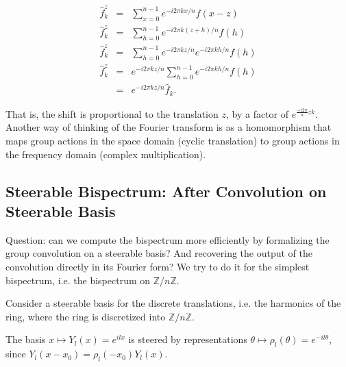\documentclass{article}
\begin{document}
\vspace{-0.7cm}
\begin{eqnarray*}
  \hat{f}^z_k &=& \sum_{x=0}^{n-1}e^{-i2\pi k x / n} f(x - z) \\
  \hat{f}^z_k &=& \sum_{h=0}^{n-1}e^{-i2\pi k (z+h) / n} f(h) \\
  \hat{f}^z_k &=& \sum_{h=0}^{n-1} e^{-i2\pi k z / n} e^{-i2\pi k h / n} f(h) \\
  \hat{f}^z_k  &=&  e^{-i2\pi k z / n} \sum_{h=0}^{n-1} e^{-i2\pi k h / n} f(h) \\
  &=& e^{-i2\pi k z / n} \hat{f}_k.
\end{eqnarray*}
\vspace{-0.7cm}

That is, the shift is proportional to the translation $z$, by a factor of $e^{\frac{-i 2 \pi}{n} z k}$. Another way of thinking of the Fourier transform is as a homomorphism that maps group actions in the space domain (cyclic translation) to group actions in the frequency domain (complex multiplication).

\subsection{Steerable Bispectrum: After Convolution on Steerable Basis}

Question: can we compute the bispectrum more efficiently by formalizing the group convolution on a steerable basis? And recovering the output of the convolution directly in its Fourier form? We try to do it for the simplest bispectrum, i.e. the bispectrum on $\mathbb{Z}/n\mathbb{Z}$.

Consider a steerable basis for the discrete translations, i.e. the harmonics of the ring, where the ring is discretized into $\mathbb{Z} / n\mathbb{Z}$.

The basis $ x \mapsto Y_l(x) = e^{ilx}$ is steered by representations $\theta \mapsto \rho_l(\theta) = e^{-il\theta}$, since $Y_l(x - x_0) = \rho_l(-x_0)Y_l(x)$.
\end{document}
